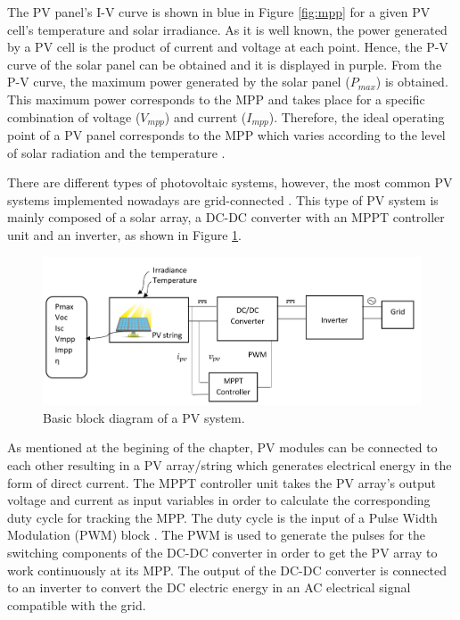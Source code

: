 The PV panel's I-V curve is shown in blue in Figure \ref{fig:mpp}
 for a given PV cell's temperature and solar irradiance. As it is well known, the power generated by a PV cell is the product of current and voltage at each point. Hence, the P-V curve of the solar panel can be obtained and it is displayed in purple. From the P-V curve, the maximum power generated by the solar panel ($P_{max}$) is obtained. This maximum power corresponds to the MPP and takes place for a specific combination of voltage ($V_{mpp}$) and current ($I_{mpp}$). Therefore, the ideal operating point of a PV panel corresponds to the MPP which varies according to the level of solar radiation and the temperature \cite{handbook}. 

There are different types of photovoltaic systems, however, the most common PV systems implemented nowadays are grid-connected \cite{handbook}. This type of PV system is mainly composed of a solar array, a DC-DC converter with an MPPT controller unit and an inverter, as shown in Figure \ref{fig:PVsystemblocks}. 

\begin{figure}[htbp]
	\includegraphics[width=\linewidth]{../Pictures/PV_system_blocks}
	\caption{Basic block diagram of a PV system.}
	\label{fig:PVsystemblocks}
\end{figure}

As mentioned at the begining of the chapter, PV modules can be connected to each other resulting in a PV array/string which generates electrical energy in the form of direct current. The MPPT controller unit takes the PV array's output voltage and current as input variables in order to calculate the corresponding duty cycle for tracking the MPP. The duty cycle is the input of a Pulse Width Modulation (PWM) block . The PWM is used to generate the pulses for the switching components of the DC-DC converter in order to get the PV array to work continuously at its MPP. The output of the DC-DC converter is connected to an inverter to convert the DC electric energy in an AC electrical signal compatible with the grid. 

